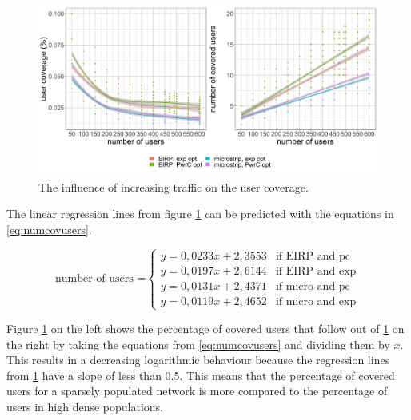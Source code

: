 \begin{figure}[h!]
  \includegraphics[width=\textwidth]{../results/s2/uvsnumdronesAndCov.png}
  \caption{The influence of increasing traffic on the user coverage.}
  \label{fig:s2uvsnumcovusers}
\end{figure}

The linear regression lines from figure \ref{fig:s2uvsnumcovusers} can be predicted with the equations in \ref{eq:numcovusers}.

\begin{equation}
\text{number of users =}
    \begin{cases}
      y = 0,0233x + 2,3553 & \text{if EIRP and pc}\\
      y = 0,0197x + 2,6144  & \text{if EIRP and exp}\\
      y = 0,0131x + 2,4371  & \text{if micro and pc}\\
      y = 0,0119x + 2,4652  & \text{if micro and exp}
    \end{cases} 
    \label{eq:numcovusers}      
\end{equation}

Figure \ref{fig:s2uvsnumcovusers} on the left shows the percentage of covered users that follow out of \ref{fig:s2uvsnumcovusers} on the right by taking the equations 
from \ref{eq:numcovusers} and dividing them by $x$.
This results in a decreasing logarithmic behaviour because the regression lines from  \ref{fig:s2uvsnumcovusers} have a slope of less than 0.5.
This means that the percentage of covered users for a sparsely populated network is more compared to the percentage of users in high dense populations.

